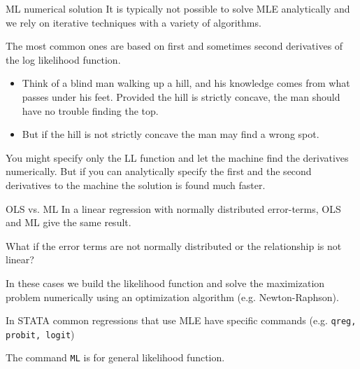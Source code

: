 \documentclass{beamer}
\begin{document}
\begin{frame}{ML numerical solution}
It is typically not possible to solve MLE analytically and we rely on iterative techniques with a variety of algorithms. \bigskip

The most common ones are based on first and sometimes second derivatives of the log likelihood function.
\begin{itemize}
\item Think of a blind man walking up a hill, and his knowledge comes from what passes under his feet. Provided the hill is strictly concave, the man should have no trouble finding the top.
\item But if the hill is not strictly concave the man may find a wrong spot.
\end{itemize}\bigskip

You might specify only the LL function and let the machine find the derivatives numerically. 
But if you can analytically specify the first and the second derivatives to the machine the solution is found much faster. 
\end{frame}

\begin{frame}{OLS vs. ML}
In a linear regression with normally distributed error-terms, OLS and ML give the same result.\bigskip

What if the error terms are not normally distributed or the relationship is not linear?\bigskip

In these cases we build the likelihood function and solve the maximization problem numerically using an optimization algorithm (e.g. Newton-Raphson).\bigskip

In STATA common regressions that use MLE have specific commands (e.g. \texttt{qreg, probit, logit})\bigskip

The command \texttt{ML} is for general likelihood function.
\end{frame}




%
%
\end{document}
